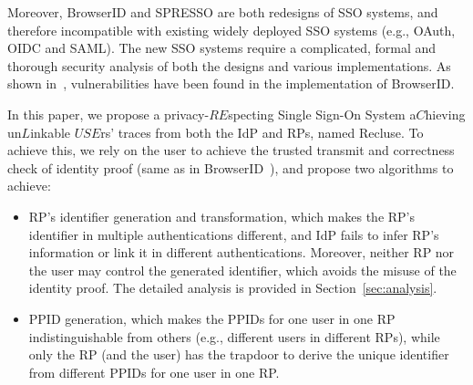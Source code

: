 

Moreover, BrowserID and SPRESSO are both redesigns of SSO systems, and therefore incompatible with existing widely deployed SSO systems (e.g., OAuth, OIDC and SAML). The new SSO systems require a complicated, formal and thorough security analysis of both the designs and various implementations. As shown in~\cite{BrowserID, browseridfett2014, gilbert2013formal}, vulnerabilities have been found in the implementation of BrowserID.

In this paper, we propose a privacy-\(RE\)specting Single Sign-On System a\(C\)hieving un\(L\)inkable \(USE\)rs' traces from both the IdP and RPs, named {Recluse}. To achieve this, we rely on the user to achieve the trusted transmit and correctness check of identity proof (same as in BrowserID~\cite{persona}), and propose two algorithms to achieve:
\begin{itemize}
\item RP's identifier generation and transformation, which makes the RP's identifier in multiple authentications  different, and IdP fails to infer RP's information or link it in different authentications. Moreover, neither RP nor the user may control the generated identifier, which avoids the misuse of the identity proof. The detailed analysis is provided in Section~\ref{sec:analysis}.
\item PPID generation, which makes the PPIDs for one user in one RP indistinguishable from others (e.g., different users in different RPs), while only the RP (and the user) has the trapdoor to derive the unique identifier from different PPIDs for one user in one RP.
\end{itemize}

